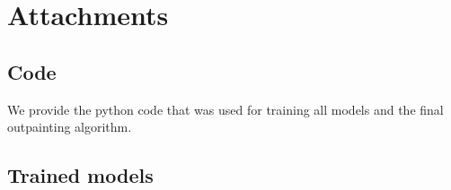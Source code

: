\documentclass[12pt,a4paper,twoside,openright]{report}
\begin{document}



\tableofcontents













\listoffigures



\appendix
\chapter{Attachments}

\section{Code}

We provide the python code that was used for training all models and the final outpainting algorithm.

\section{Trained models}
\end{document}
